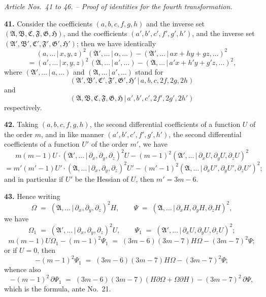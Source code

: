 \documentclass[11pt,a4paper]{article}
\providecommand{\mid}{\,|\,}
\begin{document}
\bigskip

\begin{center}
\textit{Article Nos.\ 41 to 46. -- Proof of identities for the fourth transformation.}
\end{center}

\textbf{41.} Consider the coefficients $(a,b,c,f,g,h)$ and the inverse set $(\mathfrak{A},\mathfrak{B},\mathfrak{C},\mathfrak{F},\mathfrak{G},\mathfrak{H})$, and the coefficients $(a',b',c',f',g',h')$, and the inverse set $(\mathfrak{A}',\mathfrak{B}',\mathfrak{C}',\mathfrak{F}',\mathfrak{G}',\mathfrak{H}')$; then we have identically
\[
(a,\ldots\mid x,y,z)^2\,(\mathfrak{A}',\ldots\mid\alpha,\ldots) - (\mathfrak{A}',\ldots\mid ax + hy + gz,\ldots)^2
\]
\[
= (a',\ldots\mid x,y,z)^2\,(\mathfrak{A},\ldots\mid a',\ldots) - (\mathfrak{A},\ldots\mid a'x + h'y + g'z,\ldots)^2,
\]
where $(\mathfrak{A}',\ldots\mid a,\ldots)$ and $(\mathfrak{A},\ldots\mid a',\ldots)$ stand for
\[
(\mathfrak{A}',\mathfrak{B}',\mathfrak{C}',\mathfrak{F}',\mathfrak{G}',\mathfrak{H}'\mid a,b,c,2f,2g,2h)
\]
and
\[
(\mathfrak{A},\mathfrak{B},\mathfrak{C},\mathfrak{F},\mathfrak{G},\mathfrak{H}\mid a',b',c',2f',2g',2h')
\]
respectively.

\medskip

\textbf{42.} Taking $(a,b,c,f,g,h)$, the second differential coefficients of a function $U$ of the order $m$, and in like manner $(a',b',c',f',g',h')$, the second differential coefficients of a function $U'$ of the order $m'$, we have
\[
m(m-1)U\cdot(\mathfrak{A}',\ldots\mid \partial_x,\partial_y,\partial_z)^2 U - (m-1)^2(\mathfrak{A}',\ldots\mid \partial_x U,\partial_y U,\partial_z U)^2
\]
\[
= m'(m'-1)U'\cdot(\mathfrak{A},\ldots\mid \partial_x,\partial_y,\partial_z)^2 U' - (m'-1)^2(\mathfrak{A},\ldots\mid \partial_x U',\partial_y U',\partial_z U')^2;
\]
and in particular if $U'$ be the Hessian of $U$, then $m' = 3m - 6$.

\medskip

\textbf{43.} Hence writing
\[
\Omega \;=\; (\mathfrak{A},\ldots\mid \partial_x,\partial_y,\partial_z)^2 H,\qquad \Psi \;=\; (\mathfrak{A},\ldots\mid \partial_x H,\partial_y H,\partial_z H)^2,
\]
we have
\[
\Omega_1 \;=\; (\mathfrak{A}',\ldots\mid \partial_x,\partial_y,\partial_z)^2 U,\qquad \Psi_1 \;=\; (\mathfrak{A}',\ldots\mid \partial_x U,\partial_y U,\partial_z U)^2;
\]
\[
m(m-1)U\Omega_1 - (m-1)^2 \Psi_1 \;=\; (3m-6)(3m-7)H\Omega - (3m-7)^2 \Psi;
\]
or if $U = 0$, then
\[
-(m-1)^2 \Psi_1 \;=\; (3m-6)(3m-7)H\Omega - (3m-7)^2 \Psi;
\]
whence also
\[
-(m-1)^2\,\partial\Psi_1 \;=\; (3m-6)(3m-7)(H\partial\Omega + \Omega\partial H) - (3m-7)^2\,\partial\Psi,
\]
which is the formula, ante No.~21.
\end{document}
